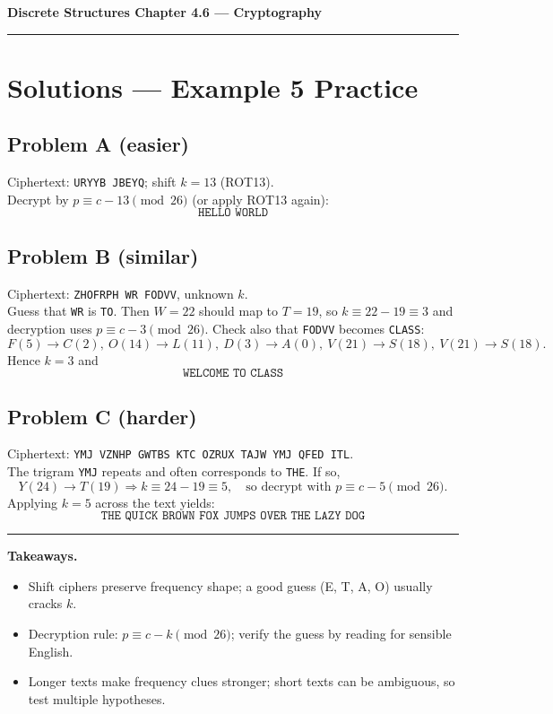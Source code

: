 \documentclass[12pt]{article}
\begin{document}
{\large \textbf{Discrete Structures \quad Chapter 4.6 — Cryptography}}

\hrule
\vspace{0.6em}

\section*{Solutions — Example 5 Practice}

\subsection*{Problem A (easier)}
Ciphertext: \texttt{URYYB JBEYQ}; shift \(k=13\) (ROT13). \\
Decrypt by \(p \equiv c-13 \pmod{26}\) (or apply ROT13 again):
\[
\boxed{\texttt{HELLO WORLD}}
\]

\subsection*{Problem B (similar)}
Ciphertext: \texttt{ZHOFRPH WR FODVV}, unknown \(k\). \\
Guess that \texttt{WR} is \texttt{TO}. Then \(W=22\) should map to \(T=19\), so \(k\equiv 22-19\equiv 3\) and decryption uses \(p\equiv c-3\pmod{26}\). Check also that \texttt{FODVV} becomes \texttt{CLASS}:
\[
F(5)\to C(2),\ O(14)\to L(11),\ D(3)\to A(0),\ V(21)\to S(18),\ V(21)\to S(18).
\]
Hence \(k=3\) and
\[
\boxed{\texttt{WELCOME TO CLASS}}
\]

\subsection*{Problem C (harder)}
Ciphertext: \texttt{YMJ VZNHP GWTBS KTC OZRUX TAJW YMJ QFED ITL}. \\
The trigram \texttt{YMJ} repeats and often corresponds to \texttt{THE}. If so,
\[
Y(24) \to T(19) \Rightarrow k \equiv 24-19 \equiv 5,\quad \text{so decrypt with } p\equiv c-5\pmod{26}.
\]
Applying \(k=5\) across the text yields:
\[
\boxed{\texttt{THE QUICK BROWN FOX JUMPS OVER THE LAZY DOG}}
\]

\bigskip
\hrule
\bigskip

\textbf{Takeaways.}
\begin{itemize}
  \item Shift ciphers preserve frequency shape; a good guess (E, T, A, O) usually cracks \(k\).
  \item Decryption rule: \(p\equiv c-k\pmod{26}\); verify the guess by reading for sensible English.
  \item Longer texts make frequency clues stronger; short texts can be ambiguous, so test multiple hypotheses.
\end{itemize}
\end{document}
